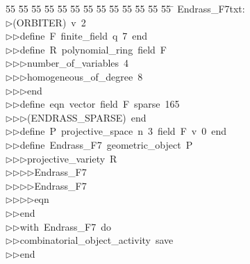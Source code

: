 %
%
\begin{tabbing}
55 \= 55 \= 55 \= 55 \= 55 \= 55 \= 55 \= 55 \= 55 \= 55 \= 55 \= 55 \= 55 \= \kill
Endrass\_F7txt:\\[0pt]
$\triangleright$\>(ORBITER)\ v\ 2\ \\[0pt]
$\triangleright$\>$\triangleright$\>define\ F\ finite\_field\ q\ 7\ end\ \\[0pt]
$\triangleright$\>$\triangleright$\>define\ R\ polynomial\_ring\ field\ F\ \\[0pt]
$\triangleright$\>$\triangleright$\>$\triangleright$\>number\_of\_variables\ 4\ \\[0pt]
$\triangleright$\>$\triangleright$\>$\triangleright$\>homogeneous\_of\_degree\ 8\ \\[0pt]
$\triangleright$\>$\triangleright$\>$\triangleright$\>end\ \\[0pt]
$\triangleright$\>$\triangleright$\>define\ eqn\ vector\ field\ F\ sparse\ 165\ \\[0pt]
$\triangleright$\>$\triangleright$\>$\triangleright$\>(ENDRASS\_SPARSE)\ end\ \\[0pt]
$\triangleright$\>$\triangleright$\>define\ P\ projective\_space\ n\ 3\ field\ F\ v\ 0\ end\ \\[0pt]
$\triangleright$\>$\triangleright$\>define\ Endrass\_F7\ geometric\_object\ P\ \\[0pt]
$\triangleright$\>$\triangleright$\>$\triangleright$\>projective\_variety\ R\ \\[0pt]
$\triangleright$\>$\triangleright$\>$\triangleright$\>$\triangleright$\>Endrass\_F7\ \\[0pt]
$\triangleright$\>$\triangleright$\>$\triangleright$\>$\triangleright$\>Endrass\_F7\ \\[0pt]
$\triangleright$\>$\triangleright$\>$\triangleright$\>$\triangleright$\>eqn\ \\[0pt]
$\triangleright$\>$\triangleright$\>end\ \\[0pt]
$\triangleright$\>$\triangleright$\>with\ Endrass\_F7\ do\ \\[0pt]
$\triangleright$\>$\triangleright$\>combinatorial\_object\_activity\ save\ \\[0pt]
$\triangleright$\>$\triangleright$\>end\\[0pt]
\end{tabbing}
